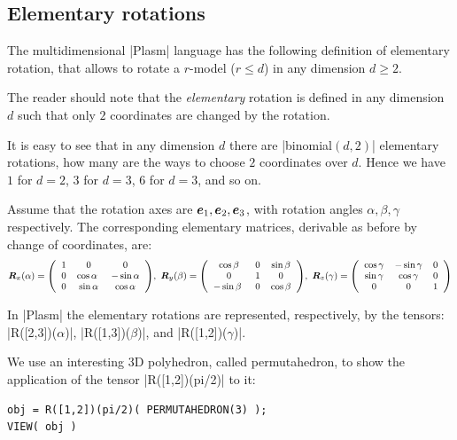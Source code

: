 \subsection*{Elementary rotations}

The multidimensional |Plasm| language has the following definition of elementary rotation, that allows to rotate a $r$-model ($r\leq d$) in any dimension $d\geq 2$.

\begin{definition}
The reader should note that the \emph{elementary} rotation is defined in any dimension $d$  such that only $2$ coordinates are changed by the rotation.
\end{definition}

\begin{remark}
It is easy to see that in any dimension $d$ there are |binomial$(d,2)$| elementary rotations, how many are the ways to choose $2$ coordinates over $d$. Hence we have $1$ for $d=2$, 3 for $d=3$, 6 for $d=3$, and so on.
\end{remark}


Assume that the rotation axes are ${\mbox{\boldmath $e$}}_1, {\mbox{\boldmath $e$}}_2, {\mbox{\boldmath $e$}}_3$, with rotation angles $\alpha, \beta, \gamma$ respectively. The corresponding elementary matrices, derivable as before by change of coordinates, are:
\begin{equation}\footnotesize
\T{R}_x(\alpha) = \mat{1 & 0 & 0 \\ 0 & \cos\alpha\ &  -\sin\alpha\\ 0 & \sin\alpha & \cos\alpha},\ 
\T{R}_y(\beta) = \mat{\cos\beta & 0 & \sin\beta\\ 0 & 1 & 0 \\ -\sin\beta\  &  0 & \cos\beta},\ 
\T{R}_z(\gamma) = \mat{\cos\gamma & -\sin\gamma & 0\\ \sin\gamma & \cos\gamma & 0\\ 0 & 0  &1}
\end{equation}

In |Plasm| the elementary rotations are represented, respectively, by the tensors: |R([2,3])($\alpha$)|, |R([1,3])($\beta$)|, and |R([1,2])($\gamma$)|. 
\begin{coding} We use an interesting 3D polyhedron, called permutahedron, to show the application of the tensor |R([1,2])(pi/2)| to it:
\begin{lstlisting}[language=JuliaLocal, style=julia, mathescape=true]
obj = R([1,2])(pi/2)( PERMUTAHEDRON(3) );
VIEW( obj )
\end{lstlisting}
\end{coding}

